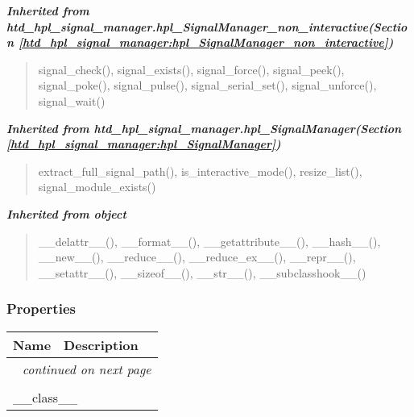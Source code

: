 \large{\textbf{\textit{Inherited from htd\_hpl\_signal\_manager.hpl\_SignalManager\_non\_interactive\textit{(Section \ref{htd_hpl_signal_manager:hpl_SignalManager_non_interactive})}}}}

\begin{quote}
signal\_check(), signal\_exists(), signal\_force(), signal\_peek(), signal\_poke(), signal\_pulse(), signal\_serial\_set(), signal\_unforce(), signal\_wait()
\end{quote}

\large{\textbf{\textit{Inherited from htd\_hpl\_signal\_manager.hpl\_SignalManager\textit{(Section \ref{htd_hpl_signal_manager:hpl_SignalManager})}}}}

\begin{quote}
extract\_full\_signal\_path(), is\_interactive\_mode(), resize\_list(), signal\_module\_exists()
\end{quote}

\large{\textbf{\textit{Inherited from object}}}

\begin{quote}
\_\_delattr\_\_(), \_\_format\_\_(), \_\_getattribute\_\_(), \_\_hash\_\_(), \_\_new\_\_(), \_\_reduce\_\_(), \_\_reduce\_ex\_\_(), \_\_repr\_\_(), \_\_setattr\_\_(), \_\_sizeof\_\_(), \_\_str\_\_(), \_\_subclasshook\_\_()
\end{quote}


  \subsubsection{Properties}

    \vspace{-1cm}
\hspace{\varindent}\begin{longtable}{|p{\varnamewidth}|p{\vardescrwidth}|l}
\cline{1-2}
\cline{1-2} \centering \textbf{Name} & \centering \textbf{Description}& \\
\cline{1-2}
\endhead\cline{1-2}\multicolumn{3}{r}{\small\textit{continued on next page}}\\\endfoot\cline{1-2}
\endlastfoot\multicolumn{2}{|l|}{\textit{Inherited from object}}\\
\multicolumn{2}{|p{\varwidth}|}{\raggedright \_\_class\_\_}\\
\cline{1-2}
\end{longtable}

